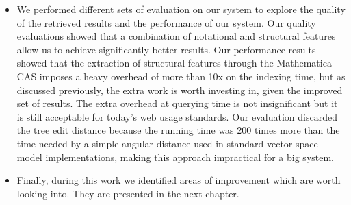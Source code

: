 \begin{itemize}
\item We performed different sets of evaluation on our system to explore the quality of the retrieved results and the performance of our system. Our quality evaluations showed that a combination of notational and structural features allow us to achieve significantly better results. Our performance results showed that the extraction of structural features through the Mathematica CAS imposes a heavy overhead of more than 10x on the indexing time, but as discussed previously, the extra work is worth investing in, given the improved set of results. The extra overhead at querying time is not insignificant but it is still acceptable for today's web usage standards. Our evaluation discarded the tree edit distance because the running time was 200 times more than the time needed by a simple angular distance used in standard vector space model implementations, making this approach impractical for a big system.
\item Finally, during this work we identified areas of improvement which are worth looking into. They are presented in the next chapter.
\end{itemize}


